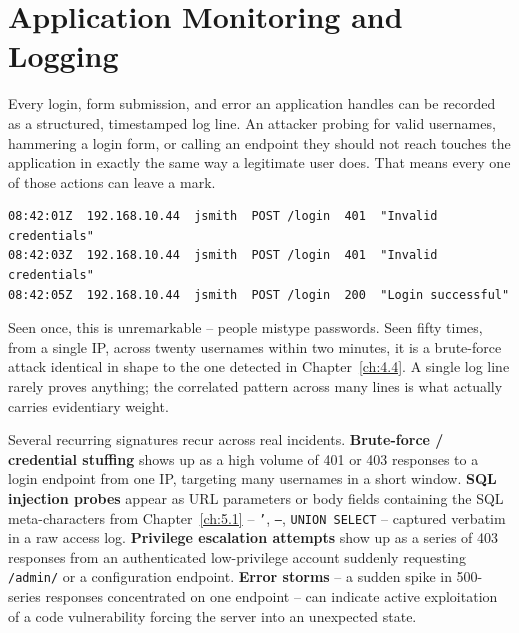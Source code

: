\section{Application Monitoring and Logging}

Every login, form submission, and error an application handles can be recorded as a structured,
timestamped log line. An attacker probing for valid usernames, hammering a login form, or calling an
endpoint they should not reach touches the application in exactly the same way a legitimate user
does. That means every one of those actions can leave a mark.

\begin{example}
{\scriptsize
\begin{verbatim}
08:42:01Z  192.168.10.44  jsmith  POST /login  401  "Invalid credentials"
08:42:03Z  192.168.10.44  jsmith  POST /login  401  "Invalid credentials"
08:42:05Z  192.168.10.44  jsmith  POST /login  200  "Login successful"
\end{verbatim}
}
Seen once, this is unremarkable -- people mistype passwords. Seen fifty times, from a single IP,
across twenty usernames within two minutes, it is a brute-force attack identical in shape to the
one detected in Chapter~\ref{ch:4.4}. A single log line rarely proves anything; the correlated
pattern across many lines is what actually carries evidentiary weight.
\end{example}

Several recurring signatures recur across real incidents. \textbf{Brute-force / credential
stuffing} shows up as a high volume of 401 or 403 responses to a login endpoint from one IP,
targeting many usernames in a short window. \textbf{SQL injection probes} appear as URL parameters
or body fields containing the SQL meta-characters from Chapter~\ref{ch:5.1} -- \texttt{'},
\texttt{--}, \texttt{UNION SELECT} -- captured verbatim in a raw access log. \textbf{Privilege
escalation attempts} show up as a series of 403 responses from an authenticated low-privilege
account suddenly requesting \texttt{/admin/} or a configuration endpoint. \textbf{Error storms} --
a sudden spike in 500-series responses concentrated on one endpoint -- can indicate active
exploitation of a code vulnerability forcing the server into an unexpected state.

